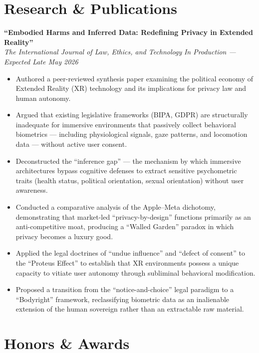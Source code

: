 \documentclass[10pt, letterpaper]{article}
\begin{document}
\section{Research \& Publications}

\textbf{``Embodied Harms and Inferred Data: Redefining Privacy in Extended Reality''} \\
\textit{The International Journal of Law, Ethics, and Technology}
\hfill \textit{In Production --- Expected Late May 2026}

\vspace{3pt}
\begin{itemize}
  \item Authored a peer-reviewed synthesis paper examining the political economy of Extended
        Reality (XR) technology and its implications for privacy law and human autonomy.
  \item Argued that existing legislative frameworks (BIPA, GDPR) are structurally inadequate
        for immersive environments that passively collect behavioral biometrics --- including
        physiological signals, gaze patterns, and locomotion data --- without active user
        consent.
  \item Deconstructed the ``inference gap'' --- the mechanism by which immersive architectures
        bypass cognitive defenses to extract sensitive psychometric traits (health status,
        political orientation, sexual orientation) without user awareness.
  \item Conducted a comparative analysis of the Apple--Meta dichotomy, demonstrating that
        market-led ``privacy-by-design'' functions primarily as an anti-competitive moat,
        producing a ``Walled Garden'' paradox in which privacy becomes a luxury good.
  \item Applied the legal doctrines of ``undue influence'' and ``defect of consent'' to the
        ``Proteus Effect'' to establish that XR environments possess a unique capacity to
        vitiate user autonomy through subliminal behavioral modification.
  \item Proposed a transition from the ``notice-and-choice'' legal paradigm to a ``Bodyright''
        framework, reclassifying biometric data as an inalienable extension of the human
        sovereign rather than an extractable raw material.
\end{itemize}

\section{Honors \& Awards}
\end{document}
